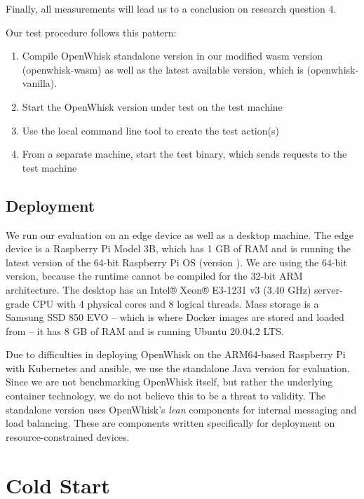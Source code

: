 Finally, all measurements will lead us to a conclusion on research question 4.

Our test procedure follows this pattern:

\begin{enumerate}
    \item Compile OpenWhisk standalone version in our modified wasm version (openwhisk-wasm) as well as the latest available version, which is  (openwhisk-vanilla).
    \item Start the OpenWhisk version under test on the test machine
    \item Use the local  command line tool to create the test action(s)
    \item From a separate machine, start the test binary, which sends requests to the test machine
\end{enumerate}

\subsection{Deployment}

We run our evaluation on an edge device as well as a  desktop machine. The edge device is a Raspberry Pi Model 3B, which has 1 GB of RAM and is running the latest version of the 64-bit Raspberry Pi OS (version ). We are using the 64-bit version, because the  runtime cannot be compiled for the 32-bit ARM architecture. The desktop has an Intel® Xeon® E3-1231 v3 (3.40 GHz) server-grade CPU with 4 physical cores and 8 logical threads. Mass storage is a Samsung SSD 850 EVO -- which is where Docker images are stored and loaded from -- it has 8 GB of RAM and is running Ubuntu 20.04.2 LTS.

Due to difficulties in deploying OpenWhisk on the ARM64-based Raspberry Pi with Kubernetes and ansible, we use the standalone Java version for evaluation. Since we are not benchmarking OpenWhisk itself, but rather the underlying container technology, we do not believe this to be a threat to validity. The standalone version uses OpenWhisk's \emph{lean} components for internal messaging and load balancing. These are components written specifically for deployment on resource-constrained devices.

\section{Cold Start}

